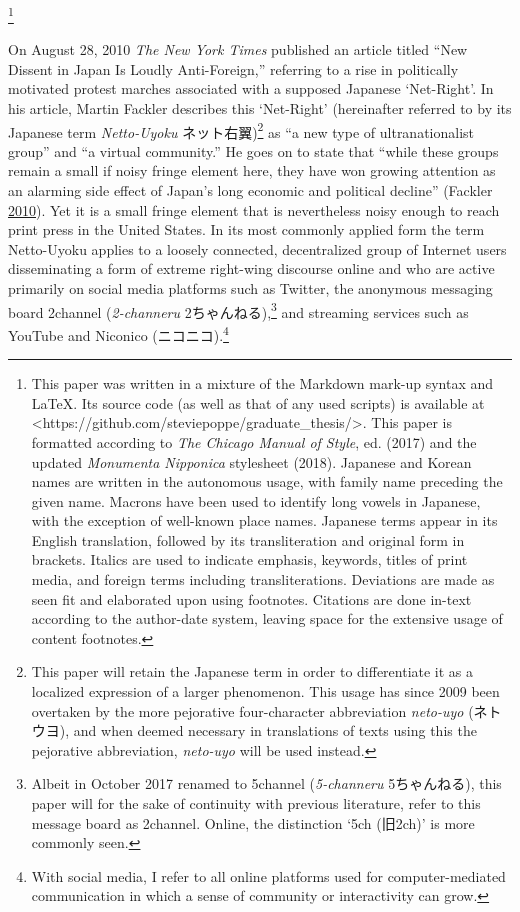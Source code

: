 \documentclass[10pt,british,A4paper,,openany]{memoir}
\newcommand\blfootnote[1]{%
  \begingroup
  \renewcommand\thefootnote{}\footnote{#1}%
  \addtocounter{footnote}{-1}%
  \endgroup
}
\begin{document}
\pagestyle{plain}


\blfootnote{This paper was written in a mixture of the Markdown mark-up syntax and \LaTeX. Its source code (as well as that of any used scripts) is available at <https://github.com/steviepoppe/graduate_thesis/>. This paper is formatted according to \textit{The Chicago Manual of Style}, \nth{17} ed. (2017) and the updated \textit{Monumenta Nipponica} stylesheet (2018). Japanese and Korean names are written in the autonomous usage, with family name preceding the given name. Macrons have been used to identify long vowels in Japanese, with the exception of well-known place names. Japanese terms appear in its English translation, followed by its transliteration and original form in brackets. Italics are used to indicate emphasis, keywords, titles of print media, and foreign terms including transliterations. Deviations are made as seen fit and elaborated upon using footnotes. Citations are done in-text according to the author-date system, leaving space for the extensive usage of content footnotes.}

On August 28, 2010 \emph{The New York Times} published an article titled
``New Dissent in Japan Is Loudly Anti-Foreign,'' referring to a rise in
politically motivated protest marches associated with a supposed
Japanese `Net-Right'. In his article, Martin Fackler describes this
`Net-Right' (hereinafter referred to by its Japanese term
\emph{Netto-Uyoku} ネット右翼)\footnote{This paper will retain the
  Japanese term in order to differentiate it as a localized expression
  of a larger phenomenon. This usage has since 2009 been overtaken by
  the more pejorative four-character abbreviation \emph{neto-uyo}
  (ネトウヨ), and when deemed necessary in translations of texts using
  this the pejorative abbreviation, \emph{neto-uyo} will be used
  instead.} as ``a new type of ultranationalist group'' and ``a virtual
community.'' He goes on to state that ``while these groups remain a
small if noisy fringe element here, they have won growing attention as
an alarming side effect of Japan's long economic and political decline''
(Fackler \protect\hyperlink{ref-fackler_new_2010-1}{2010}). Yet it is a
small fringe element that is nevertheless noisy enough to reach print
press in the United States. In its most commonly applied form the term
Netto-Uyoku applies to a loosely connected, decentralized group of
Internet users disseminating a form of extreme right-wing discourse
online and who are active primarily on social media platforms such as
Twitter, the anonymous messaging board 2channel (\emph{2-channeru}
2ちゃんねる),\footnote{Albeit in October 2017 renamed to 5channel
  (\emph{5-channeru} 5ちゃんねる), this paper will for the sake of
  continuity with previous literature, refer to this message board as
  2channel. Online, the distinction `5ch (旧2ch)' is more commonly seen.}
and streaming services such as YouTube and Niconico
(ニコニコ).\footnote{With social media, I refer to all online platforms
  used for computer-mediated communication in which a sense of community
  or interactivity can grow.}
\end{document}
